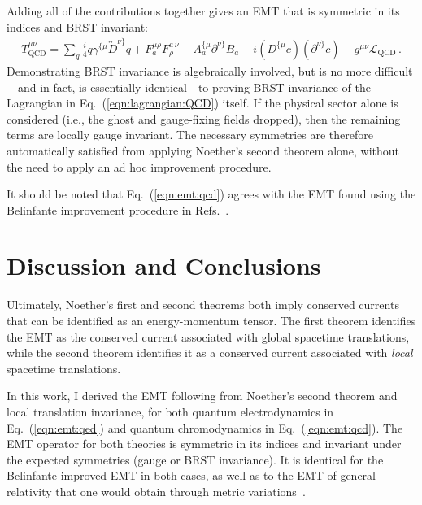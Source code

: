 \documentclass[prd,preprint,
  showpacs,showkeys,lengthcheck,
  nofootinbib,tightenlines,onecolumn,notitlepage,
  preprintnumbers,superscriptaddress]{revtex4-1}
\newcommand{\Lag}{\ensuremath{\mathscr{L}}}
\begin{document}
Adding all of the contributions together gives an EMT
that is symmetric in its indices and BRST invariant:
\begin{align}
  \label{eqn:emt:qcd}
  T_{\mathrm{QCD}}^{\mu\nu}
  =
  \sum_q \frac{i}{4} \bar q \gamma^{\{\mu} \overleftrightarrow{D}^{\nu\}} q
  + F_a^{\mu\rho} F_{\rho}^{a\,\nu}
  - A_a^{\{\mu} \partial^{\nu\}} B_a
  -i (D^{\{\mu} c) (\partial^{\nu\}} \bar{c})
  -
  g^{\mu\nu} \Lag_{\mathrm{QCD}}
  \,.
\end{align}
Demonstrating BRST invariance is algebraically involved,
but is no more difficult---and in fact, is essentially identical---to
proving BRST invariance of
the Lagrangian in Eq.~(\ref{eqn:lagrangian:QCD}) itself.
If the physical sector alone is considered
(i.e., the ghost and gauge-fixing fields dropped),
then the remaining terms are locally gauge invariant.
The necessary symmetries are therefore automatically satisfied from applying
Noether's second theorem alone, without the need to apply an
ad hoc improvement procedure.

It should be noted that Eq.~(\ref{eqn:emt:qcd}) agrees with the
EMT found using the Belinfante improvement procedure in
Refs.~\cite{Kugo:1979gm,Leader:2013jra}.



\section{Discussion and Conclusions}
\label{sec:conclusion}

Ultimately, Noether's first and second theorems both imply conserved currents
that can be identified as an energy-momentum tensor.
The first theorem identifies the EMT as the conserved current associated
with global spacetime translations,
while the second theorem identifies it as a conserved current
associated with \emph{local} spacetime translations.

In this work, I derived the EMT following from Noether's second theorem
and local translation invariance, for both
quantum electrodynamics in Eq.~(\ref{eqn:emt:qed})
and quantum chromodynamics in Eq.~(\ref{eqn:emt:qcd}).
The EMT operator for both theories is symmetric in its indices
and invariant under the expected symmetries (gauge or BRST invariance).
It is identical for the Belinfante-improved EMT in both cases,
as well as to the EMT of general relativity that one would obtain through metric
variations~\cite{Belitsky:2005qn}.
\end{document}
